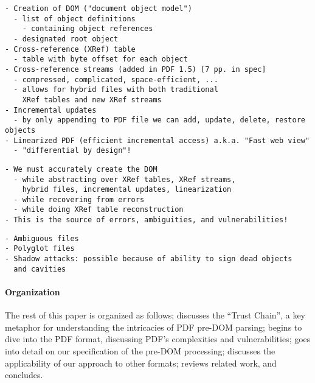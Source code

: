 \begin{lstlisting}[style=meta]
- Creation of DOM ("document object model")
  - list of object definitions
    - containing object references
  - designated root object
- Cross-reference (XRef) table
  - table with byte offset for each object
- Cross-reference streams (added in PDF 1.5) [7 pp. in spec]
  - compressed, complicated, space-efficient, ...
  - allows for hybrid files with both traditional
    XRef tables and new XRef streams
- Incremental updates
  - by only appending to PDF file we can add, update, delete, restore objects
- Linearized PDF (efficient incremental access) a.k.a. "Fast web view"
  - "differential by design"!
\end{lstlisting}
\begin{lstlisting}[style=meta]
- We must accurately create the DOM 
  - while abstracting over XRef tables, XRef streams,
    hybrid files, incremental updates, linearization
  - while recovering from errors
  - while doing XRef table reconstruction
- This is the source of errors, ambiguities, and vulnerabilities!
\end{lstlisting}

\label{sec:pdf-vulnerabilities}
\begin{lstlisting}[style=meta]
- Ambiguous files
- Polyglot files
- Shadow attacks: possible because of ability to sign dead objects
  and cavities 
\end{lstlisting}

\paragraph*{Organization} The rest of this paper is organized as
follows;
%
 discusses the ``Trust Chain'', a key metaphor
for understanding the intricacies of PDF pre-DOM parsing;
 begins to dive into the PDF format, discussing PDF's
complexities and vulnerabilities;
 goes into detail on our specification of the pre-DOM processing;
 discusses the applicability of our approach to other formats;
%
 reviews related work, and %
 concludes.

